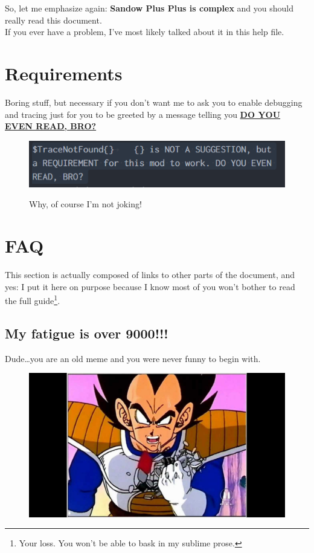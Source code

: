\documentclass[11pt]{article}
\newcommand{\bold}[1]{\textbf{#1}}
\newcommand{\important}[1]{ \MakeUppercase{\bold{#1}} }
\newlength{\imgMed}
\begin{document}
So, let me emphasize again: \bold{Sandow Plus Plus is complex} and you should really read this document. \\
If you ever have a problem, I've most likely talked about it in this help file.

\section{Requirements}
Boring stuff, but necessary if you don't want me to ask you to enable debugging and tracing just for you to be greeted by a message telling you \href{https://knowyourmeme.com/memes/do-you-even-lift}{\important{Do you even read, bro?}}

\begin{figure}[H]
    \centering
    \includegraphics[width=\imgMed]{brah}
    \label{fig:brah}
    \caption{Why, of course I'm not joking!}
\end{figure}

\pagebreak

\section{FAQ}
This section is actually composed of links to other parts of the document, and yes: I put it here on purpose because I know most of you won't bother to read the full guide\footnote{Your loss. You won't be able to bask in my sublime prose.}.

\subsection{My fatigue is over 9000!!!}
Dude\ldots you are an old meme and you were never funny to begin with.

\begin{figure}[H]
    \centering
    \includegraphics[width=\imgMed]{9000}
    \label{fig:behavior-table}
\end{figure}
\end{document}
